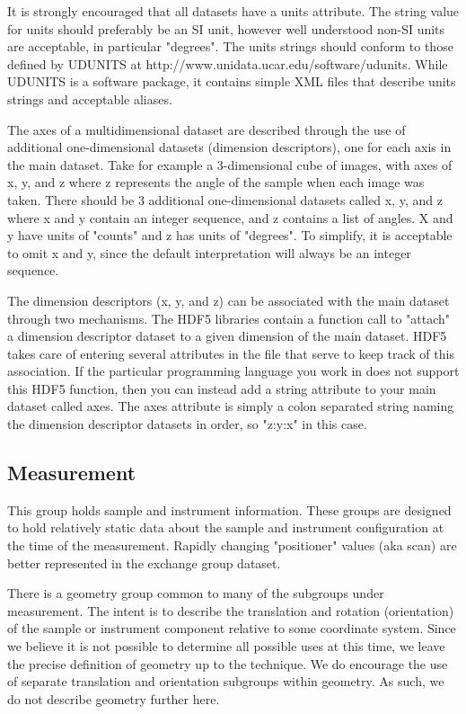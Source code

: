 It is strongly encouraged that all datasets have a units attribute. The string value for units should preferably 
be an SI unit, however well understood non-SI units are acceptable, in particular "degrees". The units 
strings should conform to those defined by UDUNITS at {http://www.unidata.ucar.edu/software/udunits}. 
While UDUNITS is a software package, it contains simple XML files that describe units strings and 
acceptable aliases.

The axes of a multidimensional dataset are described through the use of additional one-dimensional 
datasets (dimension descriptors), one for each axis in the main dataset. Take for example a 3-dimensional 
cube of images, with axes of x, y, and z where z represents the angle of the sample when each image was 
taken. There should be 3 additional one-dimensional datasets called x, y, and z where x and y contain an 
integer sequence, and z contains a list of angles. X and y have units of "counts" and z has units of 
"degrees". To simplify, it is acceptable to omit x and y, since the default interpretation will always be an 
integer sequence. 

The dimension descriptors (x, y, and z) can be associated with the main dataset through two mechanisms. 
The HDF5 libraries contain a function call to "attach" a dimension descriptor dataset to a given dimension of 
the main dataset. HDF5 takes care of entering several attributes in the file that serve to keep track of this 
association. If the particular programming language you work in does not support this HDF5 function, then 
you can instead add a string attribute to your main dataset called axes. The axes attribute is simply a colon 
separated string naming the dimension descriptor datasets in order, so "z:y:x" in this case. 

\newpage

\subsection{Measurement}
\label{table:measurement}

This group holds sample and instrument information. These groups are designed to hold relatively static data about the sample and instrument configuration at the time of the measurement. Rapidly changing "positioner" values (aka scan) are better represented in the exchange group dataset.

There is a geometry group common to many of the subgroups under measurement. The intent is to describe the translation and rotation (orientation) of the sample or instrument component relative to some coordinate system. Since we believe it is not possible to determine all possible uses at this time, we leave the precise definition of geometry up to the technique. We do encourage the use of separate translation and orientation subgroups within geometry. As such, we do not describe geometry further here.

